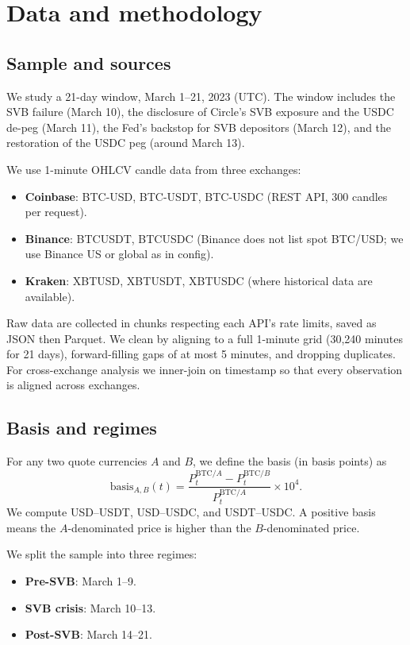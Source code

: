 \documentclass[12pt,oneside,a4paper]{article}
\begin{document}
\section{Data and methodology}

\subsection{Sample and sources}

We study a 21-day window, March 1--21, 2023 (UTC). The window includes the SVB failure (March 10), the disclosure of Circle's SVB exposure and the USDC de-peg (March 11), the Fed's backstop for SVB depositors (March 12), and the restoration of the USDC peg (around March 13).

We use 1-minute OHLCV candle data from three exchanges:
\begin{itemize}
\item \textbf{Coinbase}: BTC-USD, BTC-USDT, BTC-USDC (REST API, 300 candles per request).
\item \textbf{Binance}: BTCUSDT, BTCUSDC (Binance does not list spot BTC/USD; we use Binance US or global as in config).
\item \textbf{Kraken}: XBTUSD, XBTUSDT, XBTUSDC (where historical data are available).
\end{itemize}

Raw data are collected in chunks respecting each API's rate limits, saved as JSON then Parquet. We clean by aligning to a full 1-minute grid (30,240 minutes for 21 days), forward-filling gaps of at most 5 minutes, and dropping duplicates. For cross-exchange analysis we inner-join on timestamp so that every observation is aligned across exchanges.

\subsection{Basis and regimes}

For any two quote currencies $A$ and $B$, we define the basis (in basis points) as
\[
\text{basis}_{A,B}(t) = \frac{P^{\text{BTC}/A}_t - P^{\text{BTC}/B}_t}{P^{\text{BTC}/A}_t} \times 10^4.
\]
We compute USD--USDT, USD--USDC, and USDT--USDC. A positive basis means the $A$-denominated price is higher than the $B$-denominated price.

We split the sample into three regimes:
\begin{itemize}
\item \textbf{Pre-SVB}: March 1--9.
\item \textbf{SVB crisis}: March 10--13.
\item \textbf{Post-SVB}: March 14--21.
\end{itemize}
\end{document}
